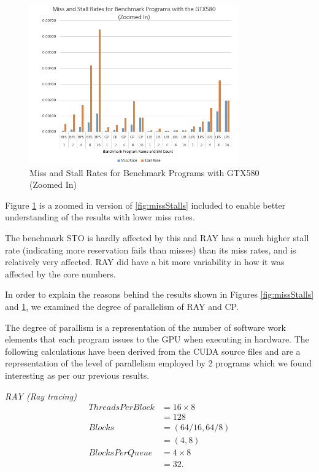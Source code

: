 \begin{figure}[b!]
\centering
\includegraphics[width=90mm]{graphics/miss_stalls_benchmarks_zoomed.png}
\caption{Miss and Stall Rates for Benchmark Programs with GTX580 (Zoomed In) }
\label{fig:missStallsZoomed}
\end{figure}

Figure \ref{fig:missStallsZoomed} is a zoomed in version of
\ref{fig:missStalls} included to enable better understanding of the
results with lower miss rates. 

The benchmark STO is hardly affected by this and RAY has a much higher
stall rate (indicating more reservation fails than misses) than its
miss rates, and is relatively very affected. 
RAY did have a bit more variability in how it was affected by the core
numbers.

In order to explain the reasons behind the results shown in Figures
\ref{fig:missStalls} and \ref{fig:missStallsZoomed}, we examined the
degree of parallelism of RAY and CP.

The degree of parallism is a representation of the number of software
work elements that each program issues to the GPU when executing in
hardware. 
The following calculations have been derived from the CUDA source
files and are a representation of the level of parallelism employed by
2 programs which we found interesting as per our previous results.


\emph{RAY (Ray tracing)}
\begin{align*}
ThreadsPerBlock& = 16 \times 8\\
& = 128\\
Blocks& = (64/16, 64/8)\\
& = (4,8)\\
BlocksPerQueue& = 4 \times 8\\
& = 32.\\
\end{align*}

